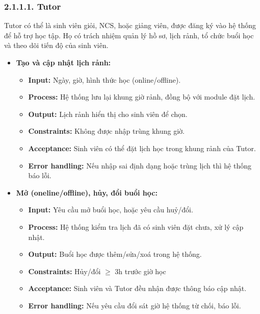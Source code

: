 \subsubsection*{2.1.1.1. Tutor}
Tutor có thể là sinh viên giỏi, NCS, hoặc giảng viên, được đăng ký vào hệ thống để hỗ trợ học tập. Họ có trách nhiệm quản lý hồ sơ, lịch rảnh, tổ chức buổi học và theo dõi tiến độ của sinh viên.
\begin{itemize}
    \item \textbf{Tạo và cập nhật lịch rảnh:}
    \begin{itemize}
        \item \textbf{Input:} Ngày, giờ, hình thức học (online/offline).
        \item \textbf{Process:} Hệ thống lưu lại khung giờ rảnh, đồng bộ với module đặt lịch.
        \item \textbf{Output:} Lịch rảnh hiển thị cho sinh viên để chọn.
        \item \textbf{Constraints:} Không được nhập trùng khung giờ.
        \item \textbf{Acceptance:} Sinh viên có thể đặt lịch học trong khung rảnh của Tutor.
        \item \textbf{Error handling:} Nếu nhập sai định dạng hoặc trùng lịch thì hệ thống báo lỗi.
    \end{itemize}
    
    \item \textbf{Mở (oneline/offline), hủy, đổi buổi học:}
    \begin{itemize}
        \item \textbf{Input:} Yêu cầu mở buổi học, hoặc yêu cầu huỷ/đổi.
        \item \textbf{Process:} Hệ thống kiểm tra lịch đã có sinh viên đặt chưa, xử lý cập nhật.
        \item \textbf{Output:} Buổi học được thêm/sửa/xoá trong hệ thống.
        \item \textbf{Constraints:} Hủy/đổi $\geq$ 3h trước giờ học
        \item \textbf{Acceptance:} Sinh viên và Tutor đều nhận được thông báo cập nhật.
        \item \textbf{Error handling:} Nếu yêu cầu đổi sát giờ hệ thống từ chối, báo lỗi.
    \end{itemize}
    

\end{itemize}
